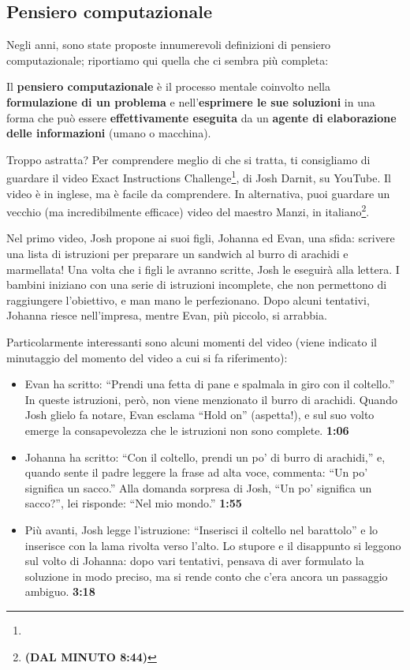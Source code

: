 \subsection{Pensiero computazionale }\label{pensiero-computazionale}

Negli anni, sono state proposte innumerevoli definizioni di pensiero computazionale; riportiamo qui quella che ci sembra più completa:


Il \textbf{pensiero computazionale} è il processo mentale coinvolto nella \textbf{formulazione di un problema} e nell'\textbf{esprimere le sue soluzioni} in una forma che può essere \textbf{effettivamente eseguita} da un \textbf{agente di elaborazione delle informazioni} (umano o macchina).

Troppo astratta? Per comprendere meglio di che si tratta, ti consigliamo di guardare il video Exact Instructions Challenge\footnote{}, di Josh Darnit, su YouTube. Il video è in inglese, ma è facile da comprendere. In alternativa, puoi guardare un vecchio (ma incredibilmente efficace) video del maestro Manzi, in italiano\footnote{ \textbf{(DAL MINUTO 8:44)}}.

Nel primo video, Josh propone ai suoi figli, Johanna ed Evan, una sfida: scrivere una lista di istruzioni per preparare un sandwich al burro di arachidi e marmellata! Una volta che i figli le avranno scritte, Josh le eseguirà alla lettera. I bambini iniziano con una serie di istruzioni incomplete, che non permettono di raggiungere l'obiettivo, e man mano le perfezionano. Dopo alcuni tentativi, Johanna riesce nell'impresa, mentre Evan, più piccolo, si arrabbia.

Particolarmente interessanti sono alcuni momenti del video (viene indicato il minutaggio del momento del video a cui si fa riferimento):

\begin{itemize}
\item
  Evan ha scritto: ``Prendi una fetta di pane e spalmala in giro con il coltello.'' In queste istruzioni, però, non viene menzionato il burro di arachidi. Quando Josh glielo fa notare, Evan esclama ``Hold on'' (aspetta!), e sul suo volto emerge la consapevolezza che le istruzioni non sono complete. \textbf{1:06}
\item
  Johanna ha scritto: ``Con il coltello, prendi un po' di burro di arachidi,'' e, quando sente il padre leggere la frase ad alta voce, commenta: ``Un po' significa un sacco.'' Alla domanda sorpresa di Josh, ``Un po' significa un sacco?'', lei risponde: ``Nel mio mondo.'' \textbf{1:55}
\item
  Più avanti, Josh legge l'istruzione: ``Inserisci il coltello nel barattolo'' e lo inserisce con la lama rivolta verso l'alto. Lo stupore e il disappunto si leggono sul volto di Johanna: dopo vari tentativi, pensava di aver formulato la soluzione in modo preciso, ma si rende conto che c'era ancora un passaggio ambiguo. \textbf{3:18}
\end{itemize}


